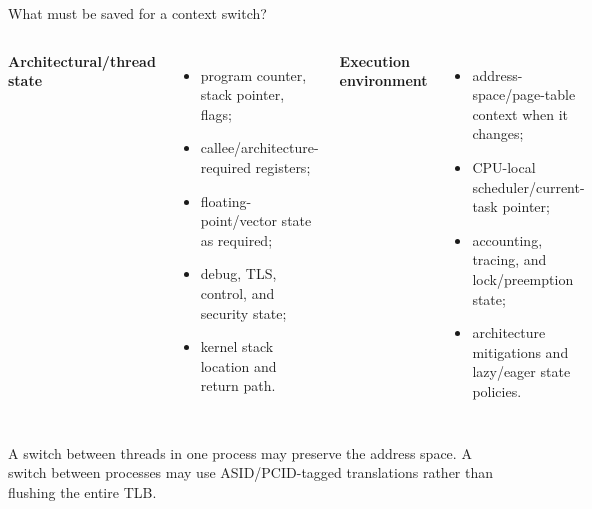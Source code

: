 \documentclass[aspectratio=169,11pt]{beamer}
\begin{document}
\begin{frame}{What must be saved for a context switch?}
  \begin{columns}[T,onlytextwidth]
      \textbf{Architectural/thread state}
      \begin{itemize}
        \item program counter, stack pointer, flags;
        \item callee/architecture-required registers;
        \item floating-point/vector state as required;
        \item debug, TLS, control, and security state;
        \item kernel stack location and return path.
      \end{itemize}
      \textbf{Execution environment}
      \begin{itemize}
        \item address-space/page-table context when it changes;
        \item CPU-local scheduler/current-task pointer;
        \item accounting, tracing, and lock/preemption state;
        \item architecture mitigations and lazy/eager state policies.
      \end{itemize}
  \end{columns}
  \begin{tcolorbox}[title=Important nuance]
    A switch between threads in one process may preserve the address space. A switch between processes may use ASID/PCID-tagged translations rather than flushing the entire TLB.
  \end{tcolorbox}
\end{frame}
\end{document}
